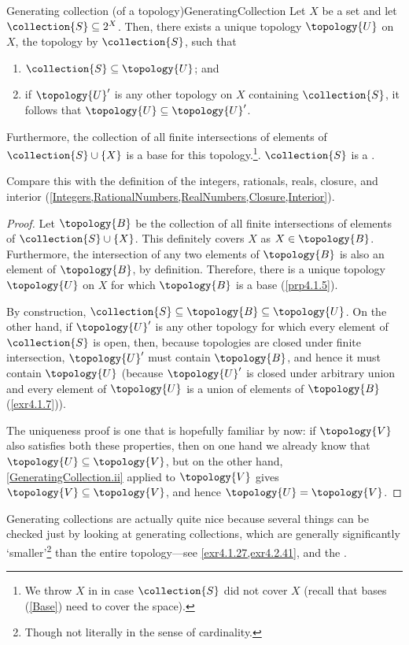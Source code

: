 \begin{prp}{Generating collection (of a top\-ology)}{GeneratingCollection}
Let $X$ be a set and let $\collection{S}\subseteq 2^X$.  Then, there exists a unique topology $\topology{U}$ on $X$, the topology  by $\collection{S}$, such that
\begin{enumerate}
\item \label{GeneratingCollection.i}$\collection{S}\subseteq \topology{U}$; and
\item \label{GeneratingCollection.ii}if $\topology{U}'$ is any other topology on $X$ containing $\collection{S}$, it follows that $\topology{U}\subseteq \topology{U}'$.
\end{enumerate}
Furthermore, the collection of all finite intersections of elements of $\collection{S}\cup \{ X\}$ is a base for this topology.\footnote{We throw $X$ in in case $\collection{S}$ did not cover $X$ (recall that bases (\cref{Base}) need to cover the space).}.  $\collection{S}$ is a .
\begin{rmk}
Compare this with the definition of the integers, rationals, reals, closure, and interior (\cref{Integers,RationalNumbers,RealNumbers,Closure,Interior}).
\end{rmk}
\begin{proof}
Let $\topology{B}$ be the collection of all finite intersections of elements of $\collection{S}\cup \{ X\}$.  This definitely covers $X$ as $X\in \topology{B}$.  Furthermore, the intersection of any two elements of $\topology{B}$ is also an element of $\topology{B}$, by definition.  Therefore, there is a unique topology $\topology{U}$ on $X$ for which $\topology{B}$ is a base (\cref{prp4.1.5}).

By construction, $\collection{S}\subseteq \topology{B}\subseteq \topology{U}$.  On the other hand, if $\topology{U}'$ is any other topology for which every element of $\collection{S}$ is open, then, because topologies are closed under finite intersection, $\topology{U}'$ must contain $\topology{B}$, and hence it must contain $\topology{U}$ (because $\topology{U}'$ is closed under arbitrary union and every element of $\topology{U}$ is a union of elements of $\topology{B}$ (\cref{exr4.1.7})).

The uniqueness proof is one that is hopefully familiar by now:  if $\topology{V}$ also satisfies both these properties, then on one hand we already know that $\topology{U}\subseteq \topology{V}$, but on the other hand, \cref{GeneratingCollection.ii} applied to $\topology{V}$ gives $\topology{V}\subseteq \topology{V}$, and hence $\topology{U}=\topology{V}$.
\end{proof}
\end{prp}
Generating collections are actually quite nice because several things can be checked just by looking at generating collections, which are generally significantly `smaller'\footnote{Though not literally in the sense of cardinality.} than the entire topology---see \cref{exr4.1.27,exr4.2.41}, and the .

